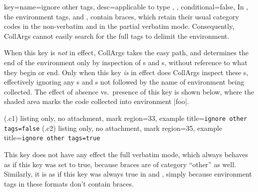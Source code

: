 \documentclass[a4paper,11pt]{article}
\begin{document}
\begin{doc}[
    pi=\docaux{cmd}{ifcollargsIgnoreOtherTags},
  ]{
    key={name=ignore other tags, desc={applicable to type ,{ }},
      conditional=false},
  }
  In , the environment tags,  and
  , contain braces, which retain their usual category codes
  in the non-verbatim and in the partial verbatim mode.  Consequently, CollArgs
  cannot easily search for the full tags to delimit the
  environment.

  When this key is \emph{not} in effect, CollArgs takes the easy path, and
  determines the end of the environment only by inspection of s and
    s, without reference to what  they begin or end.  Only
  when this key \emph{is} in effect does CollArgs inspect these s,
  effectively ignoring any s and s not followed by the name of
  environment being collected.  The effect of absence vs.\ presence of this key
  is shown below, where the shaded area marks the code collected into
  environment |foo|.

  \begin{tcbraster}
    (.c1){
      listing only, no attachment, mark region={3}{3},
      example title=\texttt{ignore other tags=false}}
    (.c2){
      listing only, no attachment, mark region={3}{5},
      example title=\texttt{ignore other tags=true}}
  \end{tcbraster}

  This key does not have any effect the full verbatim mode, which always
  behaves as if this key was set to true, because braces are of category
  ``other'' as well.  Similarly, it is as if this key was always true in
   and , simply because environment tags in
  these formats don't contain braces.
\end{doc}
\end{document}

